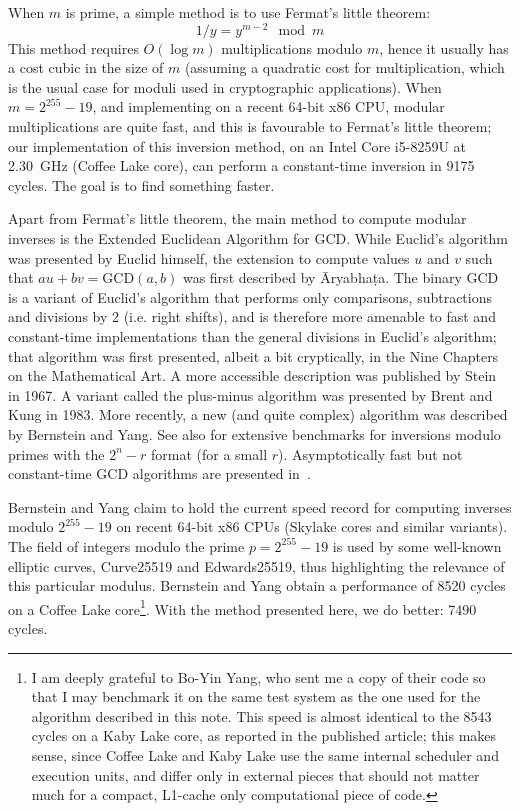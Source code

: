 \documentclass{llncs}
\begin{document}
When $m$ is prime, a simple method is to use Fermat's little theorem:
\begin{equation*}
    1/y = y^{m-2} \mod m
\end{equation*}
This method requires $O(\log m)$ multiplications modulo $m$, hence it
usually has a cost cubic in the size of $m$ (assuming a quadratic cost
for multiplication, which is the usual case for moduli used in
cryptographic applications). When $m = 2^{255}-19$, and implementing on
a recent 64-bit x86 CPU, modular multiplications are quite fast, and
this is favourable to Fermat's little theorem; our implementation of
this inversion method, on an Intel Core i5-8259U at 2.30~GHz (Coffee
Lake core), can perform a constant-time inversion in 9175 cycles. The
goal is to find something faster.

Apart from Fermat's little theorem, the main method to compute modular
inverses is the Extended Euclidean Algorithm for GCD. While Euclid's
algorithm was presented by Euclid himself\cite{Euc300BC}, the extension
to compute values $u$ and $v$ such that $au + bv = \text{GCD}(a,b)$ was
first described by \={A}ryabha\d{t}a\cite{Ary499}. The binary GCD is a
variant of Euclid's algorithm that performs only comparisons,
subtractions and divisions by 2 (i.e. right shifts), and is therefore
more amenable to fast and constant-time implementations than the general
divisions in Euclid's algorithm; that algorithm was first presented,
albeit a bit cryptically, in the Nine Chapters on the Mathematical
Art\cite{Chi1}. A more accessible description was published by Stein in
1967\cite{Ste1967}. A variant called the plus-minus algorithm was
presented by Brent and Kung in 1983\cite{BreKun1983}. More recently, a
new (and quite complex) algorithm was described by Bernstein and
Yang\cite{BerYan2019}. See also \cite{NatSar2018} for extensive
benchmarks for inversions modulo primes with the $2^n - r$ format (for a
small $r$). Asymptotically fast but not constant-time GCD algorithms are
presented in~\cite{Mol2008}.

Bernstein and Yang claim to hold the current speed record for computing
inverses modulo $2^{255}-19$ on recent 64-bit x86 CPUs (Skylake cores
and similar variants). The field of integers modulo the prime $p =
2^{255}-19$ is used by some well-known elliptic curves, Curve25519 and
Edwards25519, thus highlighting the relevance of this particular
modulus. Bernstein and Yang obtain a performance of 8520 cycles on a
Coffee Lake core\footnote{I am deeply grateful to Bo-Yin Yang, who sent
me a copy of their code so that I may benchmark it on the same test
system as the one used for the algorithm described in this note. This
speed is almost identical to the 8543 cycles on a Kaby Lake core, as
reported in the published article; this makes sense, since Coffee Lake
and Kaby Lake use the same internal scheduler and execution units, and
differ only in external pieces that should not matter much for a
compact, L1-cache only computational piece of code.}. With the method
presented here, we do better: 7490 cycles.
\end{document}
